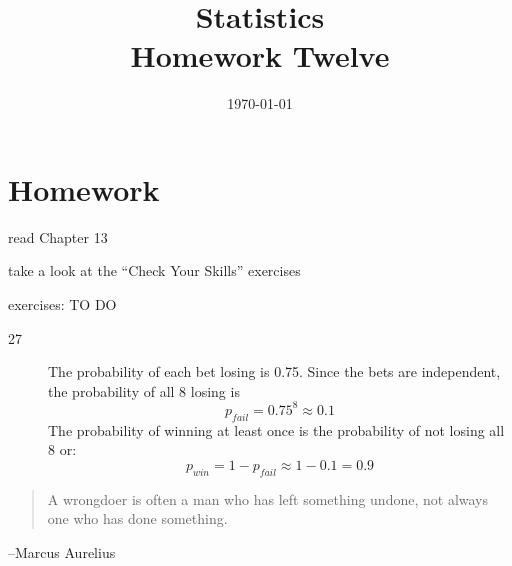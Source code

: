 \documentclass[letterpaper]{exam}
\title{Statistics \\ Homework Twelve}
\date{\today}
\author{}
\begin{document}
  \maketitle

  \section{Homework}
  \ifprintanswers
  \else
    \begin{itemize*}
      \item read Chapter 13 
      \item take a look at the ``Check Your Skills'' exercises
      \item exercises: TO DO
    \end{itemize*}
  \fi

  \ifprintanswers
    \begin{description}

      \item[27] 
        The probability of each bet losing is 0.75. Since the bets are
        independent, the probability of all 8 losing is
        \[
          p_{fail} = 0.75^8 \approx 0.1
        \]
        The probability of winning at least once is the probability of not
        losing all 8 or:
        \[
          p_{win} = 1 - p_{fail} \approx 1 - 0.1 = \boxed{ 0.9 } 
        \]

  \end{description}

  \else
    \vspace{11 cm}
    \begin{quote}
      \begin{em}
        A wrongdoer is often a man who has left something undone, not always one
        who has done something.
      \end{em}
    \end{quote}
    \hspace{1 cm}--Marcus Aurelius
  \fi
\end{document}
